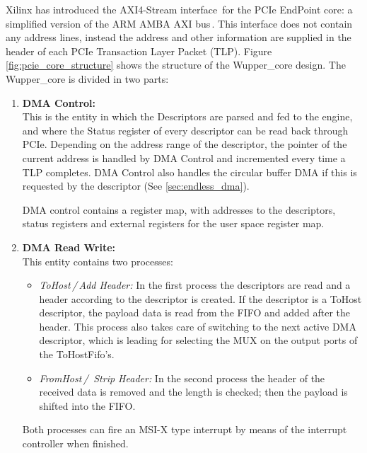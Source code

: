 Xilinx has introduced the AXI4-Stream interface\,\cite{ug761} for the PCIe EndPoint core: a simplified version of the ARM AMBA AXI bus\,\cite{arm_amba}. This interface does not contain any address lines, instead the address and other information are supplied in the header of each PCIe Transaction Layer Packet (TLP). Figure\,\ref{fig:pcie_core_structure} shows the structure of the Wupper\_core design. The Wupper\_core is divided in two parts:
\begin{enumerate}
	\item \textbf{DMA Control:} \\This is the entity in which the Descriptors are parsed and fed to the engine, and where the Status register of every descriptor can be read back through PCIe. Depending on the address range of the descriptor, the pointer of the current address is handled by DMA Control and incremented every time a TLP completes. DMA Control also handles the circular buffer DMA if this is requested by the descriptor (See \ref{sec:endless_dma}).
	
	DMA control contains a register map, with addresses to the descriptors, status registers and external registers for the user space register map. 
	
	\item \textbf{DMA Read Write:} \\This entity contains two processes:
	\begin{itemize}
		\item \textit{ToHost\,/\,Add Header:} In the first process the descriptors are read and a header according to the descriptor is created. If the descriptor is a ToHost descriptor, the payload data is read from the FIFO and added after the header. This process also takes care of switching to the next active DMA descriptor, which is leading for selecting the MUX on the output ports of the ToHostFifo's.
		\item \textit{FromHost\,/ \,Strip Header:} In the second process the header of the received data is removed and the length is checked; then the payload is shifted into the FIFO.
	\end{itemize}
	
	Both processes can fire an MSI-X type interrupt by means of the interrupt controller when finished.
\end{enumerate}

